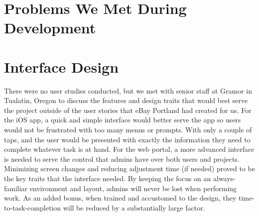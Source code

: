 \documentclass{article}
\newcommand\tab[1][0.5cm]{\hspace*{#1}}
\begin{document}
\section{Problems We Met During Development}

\section{Interface Design}
\tab There were no user studies conducted, but we met with senior staff at Gramor in Tualatin, Oregon to discuss the features and design traits that would best serve the project outside of the user stories that eBay Portland had created for us.\newline
\newline
\tab For the iOS app, a quick and simple interface would better serve the app so users would not be frustrated with too many menus or prompts. With only a couple of taps, and the user would be presented with exactly the information they need to complete whatever task is at hand. \newline
\newline
\tab For the web portal, a more advanced interface is needed to serve the control that admins have over both users and projects. Minimizing screen changes and reducing adjustment time (if needed) proved to be the key traits that the interface needed. By keeping the focus on an always-familiar environment and layout, admins will never be lost when performing work. As an added bonus, when trained and accustomed to the design, they time-to-task-completion will be reduced by a substantially large factor.
\end{document}
